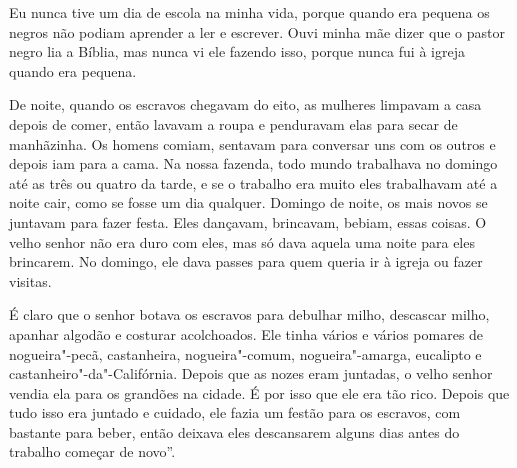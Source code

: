 Eu nunca tive um dia de escola na minha vida, porque quando era
pequena os negros não podiam aprender a ler e escrever. Ouvi minha mãe
dizer que o pastor negro lia a Bíblia, mas nunca vi ele fazendo isso,
porque nunca fui à igreja quando era pequena.

De noite, quando os escravos chegavam do eito, as mulheres
limpavam a casa depois de comer, então lavavam a roupa e penduravam elas
para secar de manhãzinha. Os homens comiam, sentavam para conversar uns
com os outros e depois iam para a cama. Na nossa fazenda, todo mundo
trabalhava no domingo até as três ou quatro da tarde, e se o trabalho
era muito eles trabalhavam até a noite cair, como se fosse um dia
qualquer. Domingo de noite, os mais novos se juntavam para fazer festa.
Eles dançavam, brincavam, bebiam, essas coisas. O velho senhor não era
duro com eles, mas só dava aquela uma noite para eles brincarem. No
domingo, ele dava passes para quem queria ir à igreja ou fazer
visitas.

É claro que o senhor botava os escravos para debulhar milho,
descascar milho, apanhar algodão e costurar acolchoados. Ele tinha
vários e vários pomares de nogueira"-pecã, castanheira, nogueira"-comum,
nogueira"-amarga, eucalipto e castanheiro"-da"-Califórnia. Depois que as
nozes eram juntadas, o velho senhor vendia ela para os grandões na
cidade. É por isso que ele era tão rico. Depois que tudo isso era
juntado e cuidado, ele fazia um festão para os escravos, com bastante
para beber, então deixava eles descansarem alguns dias antes do trabalho
começar de novo''.

